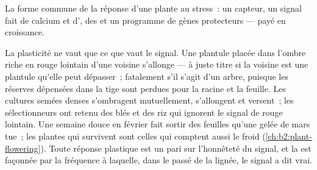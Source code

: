 \begin{omfigure}

{\small La forme commune de la réponse d'une plante au stress~: un
capteur, un signal fait de calcium et d', des  et un programme de gènes protecteurs --- payé en
croissance.}
\end{omfigure}

\begin{example}\label{ex:b2:plant-plasticity:lie}
La plasticité ne vaut que ce que vaut le signal. Une plantule placée dans
l'ombre riche en rouge lointain d'une voisine s'allonge --- à juste titre
si la voisine est une plantule qu'elle peut dépasser~; fatalement s'il
s'agit d'un arbre, puisque les réserves dépensées dans la tige sont
perdues pour la racine et la feuille. Les cultures semées denses
s'ombragent mutuellement, s'allongent et versent~; les sélectionneurs ont
retenu des blés et des riz qui ignorent le signal de rouge lointain. Une
semaine douce en février fait sortir des feuilles qu'une gelée de mars
tue~; les plantes qui survivent sont celles qui comptent aussi le froid
(\cref{ch:b2:plant-flowering}). Toute réponse plastique est un pari sur
l'honnêteté du signal, et la  est façonnée par la
fréquence à laquelle, dans le passé de la lignée, le signal a dit vrai.
\end{example}

